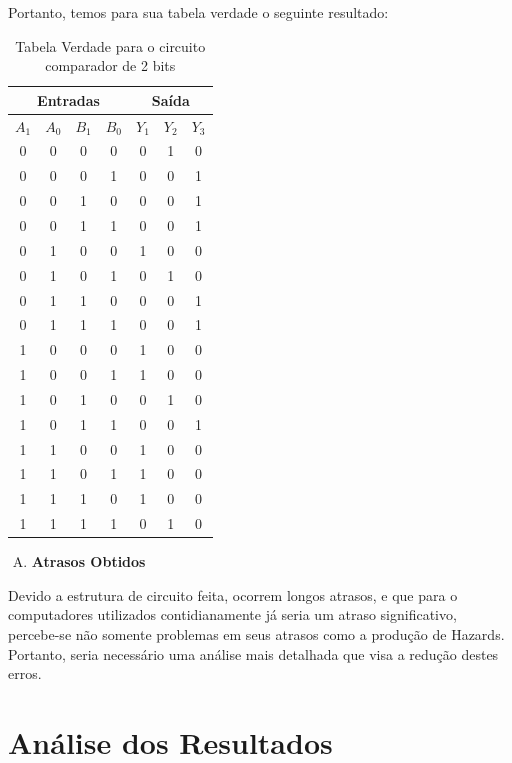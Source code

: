 \documentclass[12pt]{article}
\begin{document}
Portanto, temos para sua tabela verdade o seguinte resultado:
\begin{table}[H]
    \centering
    \caption{Tabela Verdade para o circuito comparador de 2 bits}
    \begin{tabular}{|c|c|c|c|c|c|c|}\hline
    \multicolumn{4}{|c|}{Entradas} & \multicolumn{3}{|c|}{Saída} \\\hline
    \textbf{$A_{1}$} & \textbf{$A_{0}$} & \textbf{$B_{1}$} & \textbf{$B_{0}$} & \textbf{$Y_{1}$} & \textbf{$Y_{2}$} & \textbf{$Y_{3}$} \\\hline
    0 & 0 & 0 & 0 & 0 & 1 & 0\\\hline
    0 & 0 & 0 & 1 & 0 & 0 & 1\\\hline
    0 & 0 & 1 & 0 & 0 & 0 & 1\\\hline
    0 & 0 & 1 & 1 & 0 & 0 & 1\\\hline
    0 & 1 & 0 & 0 & 1 & 0 & 0\\\hline
    0 & 1 & 0 & 1 & 0 & 1 & 0\\\hline
    0 & 1 & 1 & 0 & 0 & 0 & 1\\\hline
    0 & 1 & 1 & 1 & 0 & 0 & 1\\\hline
    1 & 0 & 0 & 0 & 1 & 0 & 0\\\hline
    1 & 0 & 0 & 1 & 1 & 0 & 0\\\hline
    1 & 0 & 1 & 0 & 0 & 1 & 0\\\hline
    1 & 0 & 1 & 1 & 0 & 0 & 1\\\hline
    1 & 1 & 0 & 0 & 1 & 0 & 0\\\hline
    1 & 1 & 0 & 1 & 1 & 0 & 0\\\hline
    1 & 1 & 1 & 0 & 1 & 0 & 0\\\hline
    1 & 1 & 1 & 1 & 0 & 1 & 0\\\hline
    \end{tabular}\label{tab:comparador_de_palavras_3_bits}
\end{table}

\begin{enumerate}[D)]
\item \textbf{Atrasos Obtidos}
\end{enumerate}
Devido a estrutura de circuito feita, ocorrem longos atrasos, e que para o computadores utilizados contidianamente já seria um atraso significativo, percebe-se não somente problemas em seus atrasos como a produção de Hazards. Portanto, seria necessário uma análise mais detalhada que visa a redução destes erros.

\section{Análise dos Resultados}
\label{sec:Resultados}
\end{document}
